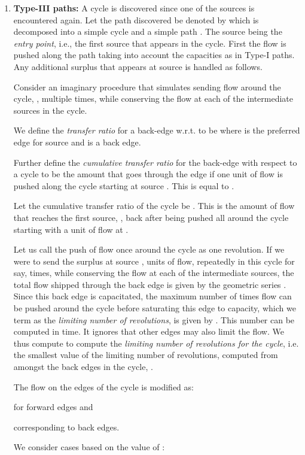 \documentclass[11pt]{article}
\begin{document}
\begin{enumerate}
\item
{\bf Type-III paths:}
A cycle is discovered since one of the sources is encountered again.
Let the path discovered be
denoted by  which is decomposed into
a simple cycle 
and a simple path .
The source  being the {\em entry point}, i.e.,
the first source that appears in the cycle. 
First the flow is pushed along the path  
taking into account the capacities as in Type-I paths.
Any additional surplus that appears at source  is handled as follows. 

Consider an imaginary procedure that simulates sending flow around the cycle, 
, multiple times, while conserving the
flow at each of the intermediate sources in the cycle.

We define  the {\em transfer ratio}  for
a back-edge  w.r.t.  
to be   where  is the preferred edge for 
source  and   is a back edge.

Further define the {\em cumulative transfer ratio}  
for the back-edge  with 
respect to a cycle 
to be the amount that goes through the edge 
if one unit of flow is pushed along the cycle starting at source . This is equal
to . 

Let the cumulative transfer ratio of the cycle be 
. This is the amount of flow that reaches
the first source, , back after being pushed all around the cycle starting with a unit of
flow at . 

Let us call the push of flow once around the cycle as one revolution.
If we were to send the surplus at source ,  units of flow,
repeatedly in this cycle for say,  times, while conserving
the flow at each of the intermediate sources, the total flow shipped through the 
back edge  is  given by the geometric 
series . 
Since this back edge is capacitated, the maximum
number of times flow can be pushed around the cycle before saturating this edge to capacity,
which we term as the {\em limiting number of revolutions},  
is given by . 
This number can be computed in  time. 
It ignores that other edges may also limit the flow.
We thus compute  to compute
the {\em limiting number of revolutions for the cycle}, i.e.
the smallest value of the limiting number of revolutions, computed from  amongst
the back edges in the cycle, .

The flow on the edges of the cycle is modified as:

for forward edges  and

corresponding to back edges.

We consider cases based on the value of :
\begin{enumerate}


\end{enumerate}
\end{enumerate}
\end{document}
